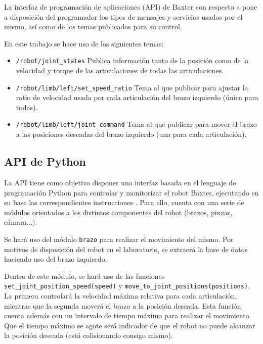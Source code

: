 La interfaz de programación de aplicaciones (API) de Baxter con respecto a \ros pone a disposición del programador los tipos de mensajes y servicios usados por el mismo, así como de los temas publicados para su control.

En este trabajo se hace uso de los siguientes temas:

\begin{itemize}
\item \texttt{/robot/joint\_states} Publica información tanto de la posición como de la velocidad y torque de las articulaciones de todas las articulaciones.
\item \texttt{/robot/limb/left/set\_speed\_ratio} Tema al que publicar para ajustar la ratio de velocidad usada por cada articulación del brazo izquierdo (única para todas).
\item \texttt{/robot/limb/left/joint\_command} Tema al que publicar para mover el brazo a las posiciones deseadas del brazo izquierdo (una para cada articulación).
\end{itemize}

\subsection{API de Python}
\label{subsubsec:metodos/pythonAPI}
La API tiene como objetivo disponer una interfaz basada en el lenguaje de programación Python para controlar y monitorizar el robot Baxter, ejecutando en su base las correspondientes instrucciones \ros. Para ello, cuenta con una serie de módulos orientados a los distintos componentes del robot (brazos, pinzas, cámara...).

Se hará uso del módulo \texttt{brazo} para realizar el movimiento del mismo. Por motivos de disposición del robot en el laboratorio, se extraerá la base de datos haciendo uso del brazo izquierdo.

\begin{sloppypar}
Dentro de este módulo, se hará uso de las funciones \texttt{set\_joint\_position\_speed(speed)} y \texttt{move\_to\_joint\_positions(positions)}. La primera controlará la velocidad máxima relativa para cada articulación, mientras que la segunda moverá el brazo a la posición deseada. Esta función cuenta además con un intervalo de tiempo máximo para realizar el movimiento. Que el tiempo máximo se agote será indicador de que el robot no puede alcanzar la posición deseada (está colisionando consigo mismo).
\end{sloppypar}

